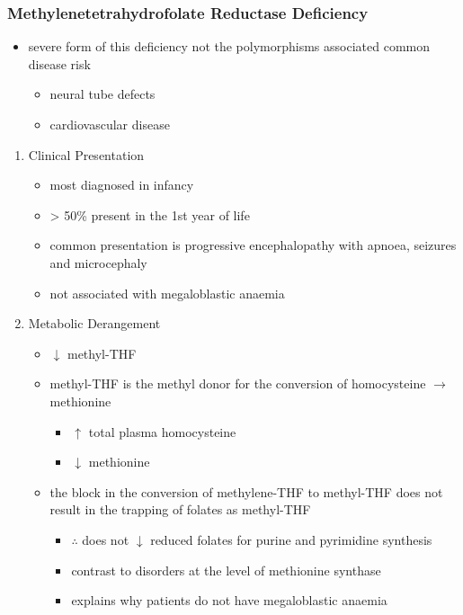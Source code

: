 \documentclass{scrartcl}
\begin{document}
\subsubsection{Methylenetetrahydrofolate Reductase Deficiency}
\label{sec:org9befe20}
\begin{itemize}
\item severe form of this deficiency not the polymorphisms associated
common disease risk
\begin{itemize}
\item neural tube defects
\item cardiovascular disease
\end{itemize}
\end{itemize}
\begin{enumerate}
\item Clinical Presentation
\label{sec:org2be3bea}
\begin{itemize}
\item most diagnosed in infancy
\item \textgreater{} 50\% present in the 1st year of life
\item common presentation is progressive encephalopathy with apnoea,
seizures and microcephaly
\item not associated with megaloblastic anaemia
\end{itemize}

\item Metabolic Derangement
\label{sec:orgea6dbf1}
\begin{itemize}
\item \(\downarrow\) methyl-THF
\item methyl-THF is the methyl donor for the conversion of homocysteine \(\to\) methionine
\begin{itemize}
\item \(\uparrow\) total plasma homocysteine
\item \(\downarrow\) methionine
\end{itemize}
\item the block in the conversion of methylene-THF to methyl-THF does not
result in the trapping of folates as methyl-THF
\begin{itemize}
\item \(\therefore\) does not \(\downarrow\) reduced folates for purine and
pyrimidine synthesis
\item contrast to disorders at the level of methionine synthase
\item explains why patients do not have megaloblastic anaemia
\end{itemize}
\end{itemize}


\end{enumerate}
\end{document}
